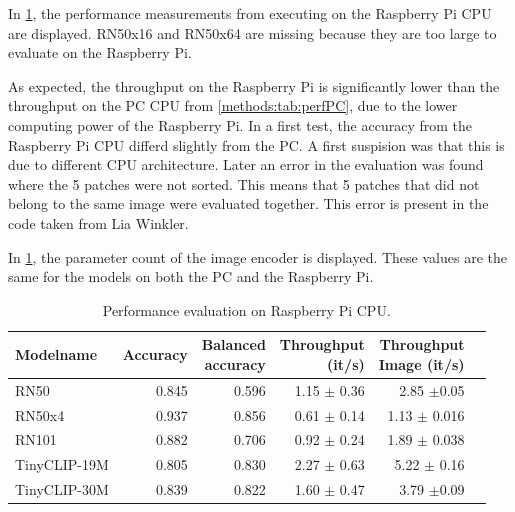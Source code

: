 In \cref{methods:tab:perfRaspi}, the performance measurements from executing on the Raspberry Pi CPU are displayed. RN50x16 and RN50x64 are missing because they are too large to evaluate on the Raspberry Pi.

As expected, the throughput on the Raspberry Pi is significantly lower than the throughput on the PC CPU from \cref{methods:tab:perfPC}, due to the lower computing power of the Raspberry Pi. In a first test, the accuracy from the Raspberry Pi CPU differd slightly from the PC.
A first suspision was that this is due to different CPU architecture.
Later an error in the evaluation was found where the 5 patches were not sorted.
This means that 5 patches that did not belong to the same image were evaluated together.
This error is present in the code taken from Lia Winkler.

In \cref{methods:tab:perfRaspi}, the parameter count of the image encoder is displayed. These values are the same for the models on both the PC and the Raspberry Pi.


\begin{table}[]
    \centering
    \begin{tabular}{l|rrrrr}
    \hline
    Modelname & Accuracy &  \makecell{Balanced \\accuracy}&\makecell{Throughput\\(it/s)} & \makecell{Throughput \\ Image (it/s)} & \\ \hline
        RN50 & 0.845 & 0.596 & 1.15 $\pm$ 0.36 & 2.85 $\pm$0.05 \\ 
        RN50x4 & 0.937 & 0.856 & 0.61 $\pm$ 0.14 & 1.13 $\pm$ 0.016\\
        RN101 & 0.882 & 0.706 & 0.92 $\pm$ 0.24 & 1.89 $\pm$ 0.038\\  
        TinyCLIP-19M & 0.805 & 0.830 & 2.27 $\pm$ 0.63& 5.22 $\pm$ 0.16\\ 
        TinyCLIP-30M & 0.839 & 0.822 & 1.60 $\pm$ 0.47& 3.79 $\pm$0.09\\ 
    \end{tabular}
    \caption{Performance evaluation on Raspberry Pi CPU.}
    \label{methods:tab:perfRaspi}
\end{table}



